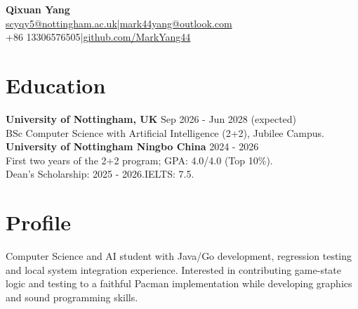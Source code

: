 \documentclass[11pt,a4paper]{article}
\begin{document}
\begin{center}
{\LARGE\bfseries\color{navy} Qixuan Yang}\\[3pt]
{\small\href{mailto:scyqy5@nottingham.ac.uk}{scyqy5@nottingham.ac.uk}\enspace|\enspace\href{mailto:mark44yang@outlook.com}{mark44yang@outlook.com}\\[2pt]
+86 13306576505\enspace|\enspace\href{https://github.com/MarkYang44}{github.com/MarkYang44}}
\end{center}
\section*{Education}
\textbf{University of Nottingham, UK} \hfill Sep 2026 - Jun 2028 (expected)\\
BSc Computer Science with Artificial Intelligence (2+2), Jubilee Campus.\\[2pt]
\textbf{University of Nottingham Ningbo China} \hfill 2024 - 2026\\
First two years of the 2+2 program; GPA: 4.0/4.0 (Top 10\%).\\
Dean's Scholarship: 2025 - 2026.\quad IELTS: 7.5.

\section*{Profile}
Computer Science and AI student with Java/Go development, regression testing and local system integration experience. Interested in contributing game-state logic and testing to a faithful Pacman implementation while developing graphics and sound programming skills.
\end{document}
